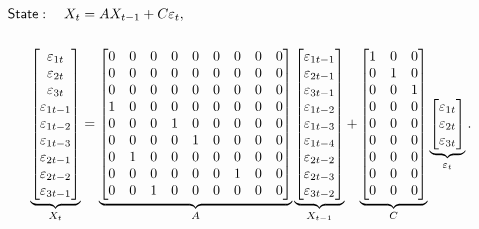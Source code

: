 \documentclass[a4paper,12pt]{article}
\begin{document}
\begin{align}
\mathsf{State}:\quad X_{t}& =AX_{t-1}+C\varepsilon _{t},  \notag \\[5mm]
\underbrace{%
\begin{bmatrix}
\varepsilon _{1t} \\
\varepsilon _{2t} \\
\varepsilon _{3t} \\
\varepsilon _{1t-1} \\
\varepsilon _{1t-2} \\
\varepsilon _{1t-3} \\
\varepsilon _{2t-1} \\
\varepsilon _{2t-2} \\
\varepsilon _{3t-1}%
\end{bmatrix}%
}_{X_{t}}& =\underbrace{%
\begin{bmatrix}
0 & 0 & 0 & 0 & 0 & 0 & 0 & 0 & 0 \\
0 & 0 & 0 & 0 & 0 & 0 & 0 & 0 & 0 \\
0 & 0 & 0 & 0 & 0 & 0 & 0 & 0 & 0 \\
1 & 0 & 0 & 0 & 0 & 0 & 0 & 0 & 0 \\
0 & 0 & 0 & 1 & 0 & 0 & 0 & 0 & 0 \\
0 & 0 & 0 & 0 & 1 & 0 & 0 & 0 & 0 \\
0 & 1 & 0 & 0 & 0 & 0 & 0 & 0 & 0 \\
0 & 0 & 0 & 0 & 0 & 0 & 1 & 0 & 0 \\
0 & 0 & 1 & 0 & 0 & 0 & 0 & 0 & 0%
\end{bmatrix}%
}_{A}\underbrace{%
\begin{bmatrix}
\varepsilon _{1t-1} \\
\varepsilon _{2t-1} \\
\varepsilon _{3t-1} \\
\varepsilon _{1t-2} \\
\varepsilon _{1t-3} \\
\varepsilon _{1t-4} \\
\varepsilon _{2t-2} \\
\varepsilon _{2t-3} \\
\varepsilon _{3t-2}%
\end{bmatrix}%
}_{X_{t-1}}+\underbrace{%
\begin{bmatrix}
1 & 0 & 0 \\
0 & 1 & 0 \\
0 & 0 & 1 \\
0 & 0 & 0 \\
0 & 0 & 0 \\
0 & 0 & 0 \\
0 & 0 & 0 \\
0 & 0 & 0 \\
0 & 0 & 0%
\end{bmatrix}%
}_{C}\underbrace{%
\begin{bmatrix}
\varepsilon _{1t} \\
\varepsilon _{2t} \\
\varepsilon _{3t}%
\end{bmatrix}%
}_{\varepsilon _{t}}.
\end{align}%
\esq\EAW
\end{document}

